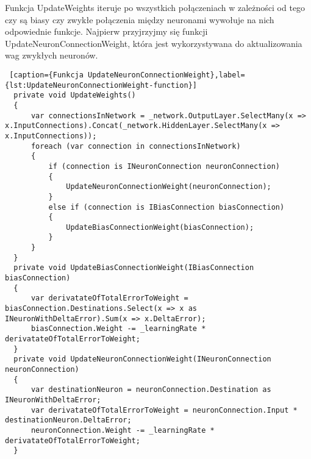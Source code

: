 Funkcja UpdateWeights iteruje po wszystkich połączeniach w zależności od tego czy są biasy czy zwykłe połączenia między neuronami wywołuje na nich odpowiednie funkcje.
Najpierw przyjrzyjmy się funkcji UpdateNeuronConnectionWeight, która jest wykorzystywana do aktualizowania wag zwykłych neuronów.


\begin{lstlisting} [caption={Funkcja UpdateNeuronConnectionWeight},label={lst:UpdateNeuronConnectionWeight-function}]
  private void UpdateWeights()
  {
      var connectionsInNetwork = _network.OutputLayer.SelectMany(x => x.InputConnections).Concat(_network.HiddenLayer.SelectMany(x => x.InputConnections));
      foreach (var connection in connectionsInNetwork)
      {
          if (connection is INeuronConnection neuronConnection)
          {
              UpdateNeuronConnectionWeight(neuronConnection);
          }
          else if (connection is IBiasConnection biasConnection)
          {
              UpdateBiasConnectionWeight(biasConnection);
          }
      }
  }
  private void UpdateBiasConnectionWeight(IBiasConnection biasConnection)
  {
      var derivatateOfTotalErrorToWeight = biasConnection.Destinations.Select(x => x as INeuronWithDeltaError).Sum(x => x.DeltaError);
      biasConnection.Weight -= _learningRate * derivatateOfTotalErrorToWeight;
  }
  private void UpdateNeuronConnectionWeight(INeuronConnection neuronConnection)
  {
      var destinationNeuron = neuronConnection.Destination as INeuronWithDeltaError;
      var derivatateOfTotalErrorToWeight = neuronConnection.Input * destinationNeuron.DeltaError;
      neuronConnection.Weight -= _learningRate * derivatateOfTotalErrorToWeight;
  }
\end{lstlisting}